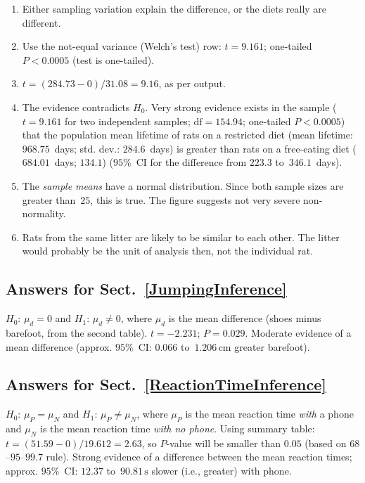 \documentclass[
  11pt,
  a4paper,
  krantz2]{krantz}
\begin{document}
\begin{footnotesize}
\begin{enumerate}
  \(H_0\): \(\mu_R = \mu_{FE}\); and \(H_1\): \(\mu_R > \mu_{FE}\); \textbf{one}-tailed, because of the RQ.
\item
  Either sampling variation explain the difference, or the diets really are different.
\item
  Use the not-equal variance (Welch's test) row: \(t = 9.161\); one-tailed \(P < 0.0005\) (test is one-tailed).
\item
  \(t = (284.73 - 0)/31.08 = 9.16\), as per output.
\item
  The evidence contradicts \(H_0\).
  Very strong evidence exists in the sample (\(t = 9.161\) for two independent samples; \(\text{df} = 154.94\); one-tailed \(P < 0.0005\)) that the population mean lifetime of rats on a restricted diet (mean lifetime: \(968.75\)~days; std. dev.: \(284.6\)~days) is greater than rats on a free-eating diet (\(684.01\)~days; \(134.1\)) (\(95\)\%~CI for the difference from \(223.3\) to~\(346.1\)~days).
\item
  The \emph{sample means} have a normal distribution.
  Since both sample sizes are greater than~\(25\), this is true.
  The figure suggests not very severe non-normality.
\item
  Rats from the same litter are likely to be similar to each other.
  The litter would probably be the unit of analysis then, not the individual rat.
\end{enumerate}

\subsection*{Answers for Sect.~\ref{JumpingInference}}\label{answers-for-sect.-refjumpinginference}

\(H_0\): \(\mu_d = 0\) and \(H_1\): \(\mu_d\ne 0\), where \(\mu_d\) is the mean difference (shoes minus barefoot, from the second table).
\(t = -2.231\); \(P = 0.029\).
Moderate evidence of a mean difference (approx. \(95\)\%~CI: \(0.066\) to~\(1.206\,\text{cm}\) greater barefoot).

\subsection*{Answers for Sect.~\ref{ReactionTimeInference}}\label{answers-for-sect.-refreactiontimeinference}

\(H_0\): \(\mu_P = \mu_N\) and \(H_1\): \(\mu_P\ne \mu_N\), where \(\mu_P\) is the mean reaction time \emph{with} a phone and \(\mu_N\) is the mean reaction time \emph{with no phone}.
Using summary table: \(t = (51.59 - 0)/19.612 = 2.63\), so \(P\)-value will be smaller than \(0.05\) (based on \(68\)--\(95\)--\(99.7\) rule).
Strong evidence of a difference between the mean reaction times; approx. \(95\)\%~CI: \(12.37\) to~\(90.81\,\text{s}\) slower (i.e., greater) with phone.


\end{footnotesize}
\end{document}
